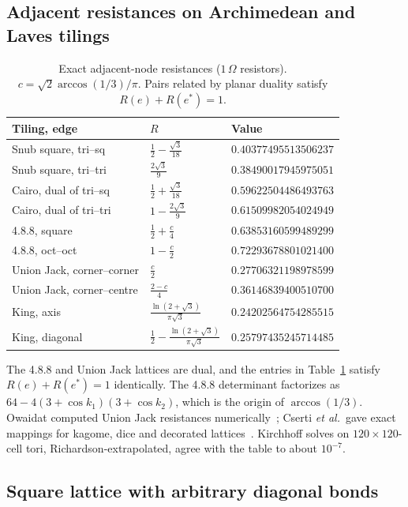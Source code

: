 \documentclass[aps,pre,10pt,twocolumn,superscriptaddress,nofootinbib]{revtex4-2}
\newcommand{\sq}{\sqrt{3}}
\begin{document}
\subsection{Adjacent resistances on Archimedean and Laves tilings}

\begin{table}
\caption{Exact adjacent-node resistances ($1\,\Omega$ resistors). $c=\sqrt2\arccos(1/3)/\pi$.
Pairs related by planar duality satisfy $R(e)+R(e^*)=1$.}
\label{tab:res}
\begin{ruledtabular}
\begin{tabular}{lll}
Tiling, edge & $R$ & Value\\
\hline
Snub square, tri--sq & $\tfrac12-\tfrac{\sq}{18}$ & $0.40377495513506237$\\
Snub square, tri--tri & $\tfrac{2\sq}{9}$ & $0.38490017945975051$\\
Cairo, dual of tri--sq & $\tfrac12+\tfrac{\sq}{18}$ & $0.59622504486493763$\\
Cairo, dual of tri--tri & $1-\tfrac{2\sq}{9}$ & $0.61509982054024949$\\
4.8.8, square & $\tfrac12+\tfrac c4$ & $0.63853160599489299$\\
4.8.8, oct--oct & $1-\tfrac c2$ & $0.72293678801021400$\\
Union Jack, corner--corner & $\tfrac c2$ & $0.27706321198978599$\\
Union Jack, corner--centre & $\tfrac{2-c}{4}$ & $0.36146839400510700$\\
King, axis & $\tfrac{\ln(2+\sq)}{\pi\sq}$ & $0.24202564754285515$\\
King, diagonal & $\tfrac12-\tfrac{\ln(2+\sq)}{\pi\sq}$ & $0.25797435245714485$\\
\end{tabular}
\end{ruledtabular}
\end{table}

The 4.8.8 and Union Jack lattices are dual, and the entries in Table~\ref{tab:res} satisfy
$R(e)+R(e^*)=1$ identically. The 4.8.8 determinant factorizes as $64-4(3+\cos k_1)(3+\cos k_2)$,
which is the origin of $\arccos(1/3)$. Owaidat computed Union Jack resistances numerically~\cite{Owaidat2013};
Cserti \emph{et al.}\ gave exact mappings for kagome, dice and decorated lattices~\cite{Cserti2011}.
Kirchhoff solves on $120\times120$-cell tori, Richardson-extrapolated, agree with the table to about
$10^{-7}$.

\subsection{Square lattice with arbitrary diagonal bonds}
\end{document}

